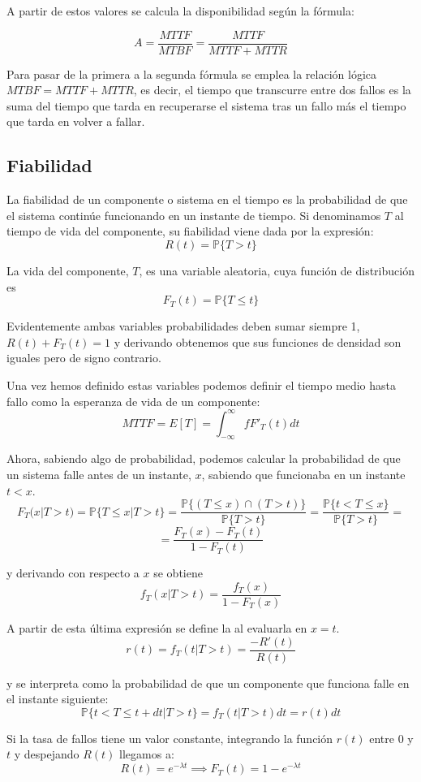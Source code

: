 A partir de estos valores se calcula la disponibilidad según la fórmula:

\[A=\frac{MTTF}{MTBF}=\frac{MTTF}{MTTF+MTTR}\]

Para pasar de la primera a la segunda fórmula se emplea la relación lógica $MTBF=MTTF+MTTR$, es decir, el tiempo que transcurre entre dos fallos es la suma del tiempo que tarda en recuperarse el sistema tras un fallo más el tiempo que tarda en volver a fallar.

\subsection{Fiabilidad}

La fiabilidad de un componente o sistema en el tiempo es la probabilidad de que el sistema continúe funcionando en un instante de tiempo. Si denominamos $T$ al tiempo de vida del componente, su fiabilidad viene dada por la expresión:
\[R(t)=\mathbb{P}\{T > t \}\]

La vida del componente, $T$, es una variable aleatoria, cuya función de distribución es
\[F_T(t)=\mathbb{P}\{T \leq t \}\]

Evidentemente ambas variables probabilidades deben sumar siempre 1, $R(t)+F_T(t)=1$ y derivando obtenemos que sus funciones de densidad son iguales pero de signo contrario.

Una vez hemos definido estas variables podemos definir el tiempo medio hasta fallo como la esperanza de vida de un componente:
\[MTTF = E[T]=\int_{-\infty}^{\infty}fF'_T(t)dt\]

Ahora, sabiendo algo de probabilidad, podemos calcular la probabilidad de que un sistema falle antes de un instante, $x$, sabiendo que funcionaba en un instante $t<x$.
\[F_T(x | T > t ) = \mathbb{P}\{T \leq x | T> t\}=\frac{\mathbb{P}\{(T \leq x) \cap (T > t)\}}{\mathbb{P}\{T > t\}}=\frac{\mathbb{P}\{t < T \leq x\}}{\mathbb{P}\{T > t\}}=\]
\[=\frac{F_T(x)-F_T(t)}{1-F_T(t)}\]

y derivando con respecto a $x$ se obtiene
\[f_T(x | T > t)=\frac{f_T(x)}{1-F_T(x)}\]

A partir de esta última expresión se define la  al evaluarla en $x=t$.
\[r(t)=f_T(t | T > t)=\frac{-R'(t)}{R(t)}\]

y se interpreta como la probabilidad de que un componente que funciona falle en el instante siguiente:
\[\mathbb{P}\{t<T\leq t + dt | T > t\}=f_T(t | T > t)dt=r(t)dt\]

Si la tasa de fallos tiene un valor constante, integrando la función $r(t)$ entre $0$ y $t$ y despejando $R(t)$ llegamos a:
\[R(t)=e^{-λt} \implies F_T(t) = 1-e^{-λt}\]

